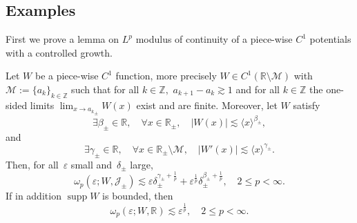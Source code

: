 \subsection{Examples}
\label{subsec:Ex.mol}

First we prove a lemma on $L^p$ modulus of continuity of a piece-wise $C^1$ potentials with a controlled growth.

\begin{Lemma}\label{lem:W1.om.p}
Let $W$ be a piece-wise $C^1$ function, more precisely $W \in C^1({\mathbb{R}} \setminus \mathcal M)$ with $\mathcal M:= \{a_k\}_{k \in {\mathbb{Z}}}$ such that for all  $k \in {\mathbb{Z}},$ $a_{k+1} - a_k {\gtrsim} 1$ and for all $k \in {\mathbb{Z}}$ the one-sided limits $\lim_{x \to {a_k}_\pm }W(x)$ exist and are finite. Moreover, let $W$ satisfy 
		\begin{equation}
	\exists \beta_\pm \in {\mathbb{R}}, \quad \forall x \in {\mathbb{R}}_\pm, \quad |W(x)| {\lesssim} \langle x \rangle^{\beta_\pm},
	\end{equation}
		and
		\begin{equation}
	\exists \gamma_\pm \in {\mathbb{R}}, \quad \forall x \in {\mathbb{R}}_\pm \setminus \mathcal M, \quad |W'(x)| {\lesssim} \langle x \rangle^{\gamma_\pm}.
	\end{equation}
		Then, for all~${\varepsilon}$ small and~$\delta_\pm$ large,
		\begin{equation}\label{om.p.W}
	\omega_p({\varepsilon}; W, {\mathcal J}_\pm) 
	{\lesssim}
	{\varepsilon} \delta_\pm^{\gamma_\pm + \frac 1p} + {\varepsilon}^\frac 1p \delta_\pm^{\beta_\pm + \frac 1p}, \quad 2 \leq p < \infty.
	\end{equation}
If in addition ${\mathop{\mathrm{supp}}\nolimits} W$ is bounded, then
\begin{equation}\label{om.p.bdd.supp}
\omega_p({\varepsilon}; W, {\mathbb{R}}) 
{\lesssim}
{\varepsilon}^\frac 1p, \quad 2 \leq p < \infty.
\end{equation}

\end{Lemma}
